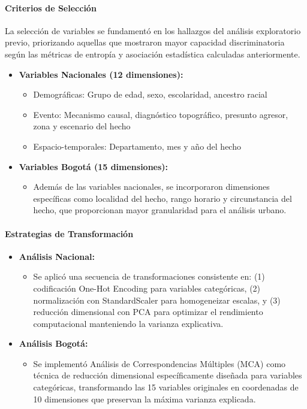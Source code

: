\documentclass[lettersize,journal]{IEEEtran}
\begin{document}
\paragraph{Criterios de Selección}
La selección de variables se fundamentó en los hallazgos del análisis exploratorio previo, priorizando aquellas que mostraron mayor capacidad discriminatoria según las métricas de entropía y asociación estadística calculadas anteriormente.

\begin{itemize}
    \item \textbf{Variables Nacionales (12 dimensiones):}
    \begin{itemize}
        \item Demográficas: Grupo de edad, sexo, escolaridad, ancestro racial
        \item Evento: Mecanismo causal, diagnóstico topográfico, presunto agresor, zona y escenario del hecho
        \item Espacio-temporales: Departamento, mes y año del hecho
    \end{itemize}
    
    \item \textbf{Variables Bogotá (15 dimensiones):}
    \begin{itemize}
        \item Además de las variables nacionales, se incorporaron dimensiones específicas como localidad del hecho, rango horario y circunstancia del hecho, que proporcionan mayor granularidad para el análisis urbano.
    \end{itemize}
\end{itemize}

\paragraph{Estrategias de Transformación}

\begin{itemize}
    \item \textbf{Análisis Nacional:}
    \begin{itemize}
        \item Se aplicó una secuencia de transformaciones consistente en: (1) codificación One-Hot Encoding para variables categóricas, (2) normalización con StandardScaler para homogeneizar escalas, y (3) reducción dimensional con PCA para optimizar el rendimiento computacional manteniendo la varianza explicativa.
    \end{itemize}
    
    \item \textbf{Análisis Bogotá:}
    \begin{itemize}
        \item Se implementó Análisis de Correspondencias Múltiples (MCA) como técnica de reducción dimensional específicamente diseñada para variables categóricas, transformando las 15 variables originales en coordenadas de 10 dimensiones que preservan la máxima varianza explicada.
    \end{itemize}
\end{itemize}
\end{document}

